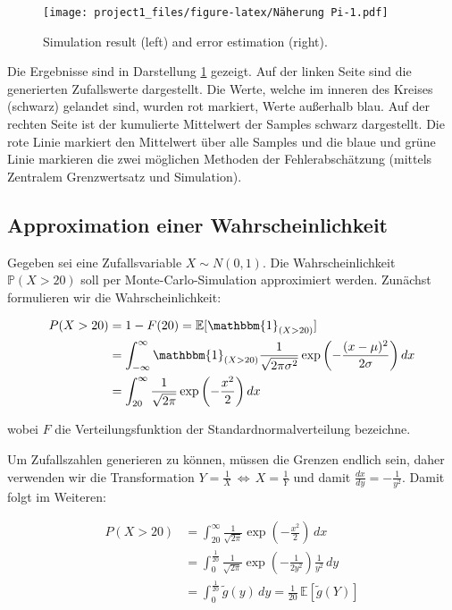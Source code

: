 \documentclass[10pt,]{article}
\begin{document}
\begin{figure}[htbp]
\centering
\texttt{[image: project1\_files/figure-latex/Näherung Pi-1.pdf]}
\caption{Simulation result (left) and error estimation
(right).\label{fig:plotPi}}
\end{figure}

Die Ergebnisse sind in Darstellung \ref{fig:plotPi} gezeigt. Auf der
linken Seite sind die generierten Zufallswerte dargestellt. Die Werte,
welche im inneren des Kreises (schwarz) gelandet sind, wurden rot
markiert, Werte außerhalb blau. Auf der rechten Seite ist der kumulierte
Mittelwert der Samples schwarz dargestellt. Die rote Linie markiert den
Mittelwert über alle Samples und die blaue und grüne Linie markieren die
zwei möglichen Methoden der Fehlerabschätzung (mittels Zentralem
Grenzwertsatz und Simulation).

\subsection{Approximation einer
Wahrscheinlichkeit}\label{approximation-einer-wahrscheinlichkeit}

Gegeben sei eine Zufallsvariable \(X \sim N(0,1)\). Die
Wahrscheinlichkeit \(\mathbb{P}(X > 20)\) soll per
Monte-Carlo-Simulation approximiert werden. Zunächst formulieren wir die
Wahrscheinlichkeit:

\begin{align*}
P(X > 20) &= 1-F(20) = \mathbb{E}[\mathbbm{1}_{(X > 20)}]\\
&= \int_{-\infty}^{\infty} \mathbbm{1}_{(X > 20)} \frac{1}{\sqrt{2\pi\sigma^2}} \exp{\left(-\frac{(x -\mu)^2}{2\sigma}\right)}\,dx\\
&= \int_{20}^{\infty} \frac{1}{\sqrt{2\pi}} \exp{\left(-\frac{x^2}{2}\right)}\,dx
\end{align*}

wobei \(F\) die Verteilungsfunktion der Standardnormalverteilung
bezeichne.

Um Zufallszahlen generieren zu können, müssen die Grenzen endlich sein,
daher verwenden wir die Transformation
\(Y = \frac{1}{X} \,\Leftrightarrow\, X = \frac{1}{Y}\) und damit
\(\frac{dx}{dy} = -\frac{1}{y^2}\). Damit folgt im Weiteren:

\begin{align*}
P(X > 20) &= \int_{20}^{\infty} \frac{1}{\sqrt{2\pi}} \exp{\left(-\frac{x^2}{2}\right)}\,dx\\
&= \int_{0}^{\frac{1}{20}} \frac{1}{\sqrt{2\pi}} \exp{\left(-\frac{1}{2y^2}\right)} \frac{1}{y^2}\,dy\\
&= \int_{0}^{\frac{1}{20}} \tilde{g}(y)\,dy = \frac{1}{20}\,\mathbb{E}[\tilde{g}(Y)]
\end{align*}
\end{document}
